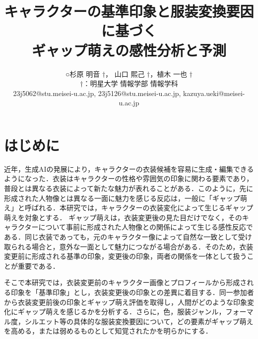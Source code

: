 \documentclass[a4j,twocolumn,11pt]{jarticle}
\title{
\vspace{60pt}
\LARGE{
\textbf{キャラクターの基準印象と服装変換要因に基づく\\
ギャップ萌えの感性分析と予測}}
}
\author{
\vspace{1.5em}
○杉原 明音 $\dagger$， 山口 熙己 $\dagger$，植木 一也 $\dagger$\\
\vspace{0.5em}
$\dagger$：明星大学 情報学部 情報学科\\
\textrm{23j5062@stu.meisei-u.ac.jp, 23j5126@stu.meisei-u.ac.jp, kazuya.ueki@meisei-u.ac.jp} \\
}
\date{} %
\begin{document}
\vspace{1em}

\section{はじめに}
近年，生成AIの発展により，キャラクターの衣装候補を容易に生成・編集できるようになった．衣装はキャラクターの性格や雰囲気の印象に関わる要素であり，普段とは異なる衣装によって新たな魅力が表れることがある．このように，先に形成された人物像とは異なる一面に魅力を感じる反応は，一般に「ギャップ萌え」と呼ばれる．本研究では，キャラクターの衣装変化によって生じるギャップ萌えを対象とする．
ギャップ萌えは，衣装変更後の見た目だけでなく，そのキャラクターについて事前に形成された人物像との関係によって生じる感性反応である．同じ衣装であっても，元のキャラクター像によって自然な一致として受け取られる場合と，意外な一面として魅力につながる場合がある．そのため，衣装変更前に形成される基準の印象，変更後の印象，両者の関係を一体として扱うことが重要である．

そこで本研究では，衣装変更前のキャラクター画像とプロフィールから形成される印象を「基準印象」とし，衣装変更後の印象との差異に着目する．同一参加者から衣装変更前後の印象とギャップ萌え評価を取得し，人間がどのような印象変化にギャップ萌えを感じるかを分析する．さらに，色，服装ジャンル，フォーマル度，シルエット等の具体的な服装変換要因について，どの要素がギャップ萌えを高める，または弱めるものとして知覚されたかを明らかにする．
\end{document}
